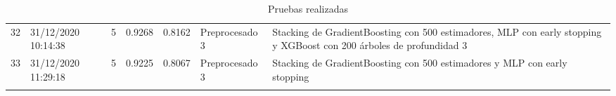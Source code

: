 \documentclass[oneside]{book}
\begin{document}
\begin{longtable}{|c|C{2.1cm}|c|c|c|C{4cm}|C{6cm}|}
\midrule


32 & 31/12/2020 10:14:38 & 5 & 0.9268  & 0.8162 & Preprocesado 3 & Stacking de GradientBoosting con 500 estimadores, MLP con early stopping y XGBoost con 200 árboles de profundidad 3 \\

\midrule

33 & 31/12/2020 11:29:18 & 5 & 0.9225  & 0.8067 & Preprocesado 3 & Stacking de GradientBoosting con 500 estimadores y MLP con early stopping \\

\bottomrule
\caption{Pruebas realizadas}
\label{tab:pruebas}
\end{longtable}
\end{document}
